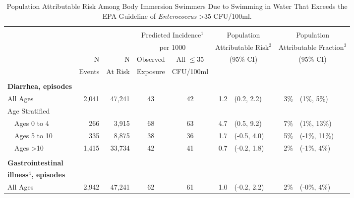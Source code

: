 \documentclass[12pt]{article}\usepackage[]{graphicx}\usepackage[]{color}
\begin{document}
\begin{table}[h!tb]
\begin{footnotesize}
\begin{center}
\begin{minipage}{0.8\textwidth}
\caption{Population Attributable Risk Among Body Immersion Swimmers Due to Swimming in Water That Exceeds the EPA Guideline of \textit{Enterococcus} >35 CFU/100ml.   \label{tab:ARwatexp}}
\end{minipage}
\begin{tabular}{l rr cc rl rl}
 & \\
 &  &  & \multicolumn{2}{c}{Predicted Incidence$^1$}  & \multicolumn{2}{c}{Population}        & \multicolumn{2}{c}{Population}    \\
 & &                     & \multicolumn{2}{c}{per 1000}             & \multicolumn{2}{c}{Attributable Risk$^2$} & \multicolumn{2}{c}{Attributable Fraction$^3$} \\
\cline{4-5}
 & N        & N          & Observed  & All $\leq$35                &  \multicolumn{2}{c}{(95\% CI)}        & \multicolumn{2}{c}{(95\% CI)}   \\
 &  Events  &  At Risk   & Exposure  & CFU/100ml  \\
\hline
& \\
\textbf{Diarrhea, episodes} \\
 All Ages & 2,041 & 47,241 & 43 & 42 & 1.2 & (0.2, 2.2) & 3\% & (1\%, 5\%) \\ 
  
Age Stratified \\
 ~~Ages 0 to 4 & 266 & 3,915 & 68 & 63 & 4.7 & (0.5, 9.2) & 7\% & (1\%, 13\%) \\ 
 ~~Ages 5 to 10 & 335 & 8,875 & 38 & 36 & 1.7 & (-0.5, 4.0) & 5\% & (-1\%, 11\%) \\ 
 ~~Ages >10 & 1,415 & 33,734 & 42 & 41 & 0.7 & (-0.2, 1.8) & 2\% & (-1\%, 4\%) \\ 
  
& \\
\textbf{Gastrointestinal} \\
\textbf{illness$^4$, episodes} \\
 All Ages & 2,942 & 47,241 & 62 & 61 & 1.0 & (-0.2, 2.2) & 2\% & (-0\%, 4\%) \\ 
  

\end{tabular}
\end{center}
\end{footnotesize}
\end{table}
\end{document}
